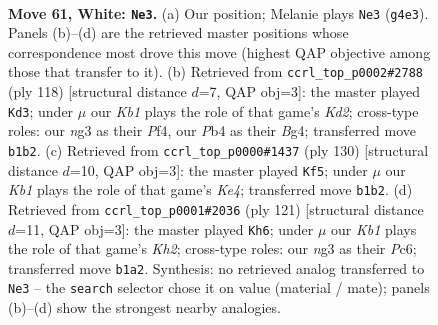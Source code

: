 \documentclass[11pt]{article}
\begin{document}
\clearpage

\begin{figure}[p]\centering
\begin{subfigure}{0.46\textwidth}\centering
\resizebox{\linewidth}{!}{%
\newchessgame
\chessboard[
  setfen={8/kb6/8/P7/1P4N1/6n1/3p4/1K6 w - - 0 61},
  showmover=false,
  pgfstyle=straightmove, color=movearrow, markmove={g4-e3}
]}
\caption{}
\end{subfigure}\hfill
\begin{subfigure}{0.46\textwidth}\centering
\resizebox{\linewidth}{!}{%
\newchessgame
\chessboard[
  setfen={8/8/2bk4/8/1p1P1PB1/8/3K4/8 w - - 0 60},
  showmover=false,
  pgfstyle=straightmove, color=movearrow, markmove={d2-d3}
]}
\caption{}
\end{subfigure}
\\[4pt]
\begin{subfigure}{0.46\textwidth}\centering
\resizebox{\linewidth}{!}{%
\newchessgame
\chessboard[
  setfen={7b/2p4k/5P2/6P1/4K3/8/8/8 w - - 0 66},
  showmover=false,
  pgfstyle=straightmove, color=movearrow, markmove={e4-f5}
]}
\caption{}
\end{subfigure}\hfill
\begin{subfigure}{0.46\textwidth}\centering
\resizebox{\linewidth}{!}{%
\newchessgame
\chessboard[
  setfen={8/7k/1pp5/8/p7/8/BK6/8 b - - 31 61},
  showmover=false,
  pgfstyle=straightmove, color=movearrow, markmove={h7-h6}
]}
\caption{}
\end{subfigure}
\caption{\textbf{Move 61, White: \texttt{Ne3}.} (a) Our position; Melanie plays \texttt{Ne3} (\texttt{g4e3}). Panels (b)--(d) are the retrieved master positions whose correspondence most drove this move (highest QAP objective among those that transfer to it). (b) Retrieved from \texttt{ccrl\_top\_p0002\#2788} (ply 118) [structural distance $d$=7, QAP obj=3]: the master played \texttt{Kd3}; under $\mu$ our \emph{Kb1} plays the role of that game's \emph{Kd2}; cross-type roles: our \emph{n}g3 as their \emph{P}f4, our \emph{P}b4 as their \emph{B}g4; transferred move \texttt{b1b2}. (c) Retrieved from \texttt{ccrl\_top\_p0000\#1437} (ply 130) [structural distance $d$=10, QAP obj=3]: the master played \texttt{Kf5}; under $\mu$ our \emph{Kb1} plays the role of that game's \emph{Ke4}; transferred move \texttt{b1b2}. (d) Retrieved from \texttt{ccrl\_top\_p0001\#2036} (ply 121) [structural distance $d$=11, QAP obj=3]: the master played \texttt{Kh6}; under $\mu$ our \emph{Kb1} plays the role of that game's \emph{Kh2}; cross-type roles: our \emph{n}g3 as their \emph{P}c6; transferred move \texttt{b1a2}. Synthesis: no retrieved analog transferred to \texttt{Ne3} -- the \texttt{search} selector chose it on value (material / mate); panels (b)--(d) show the strongest nearby analogies.}
\label{fig:thought-m120}
\end{figure}
\end{document}
